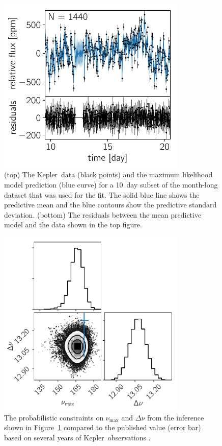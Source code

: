 \documentclass[manuscript, letterpaper]{aastex6}
\newcommand{\project}[1]{\textsf{#1}}
\newcommand{\kepler}{\project{Kepler}}
\newcommand{\figureref}[1]{\ref{fig:#1}}
\newcommand{\Figure}[1]{Figure~\figureref{#1}}
\newcommand{\figurelabel}[1]{\label{fig:#1}}
\newcommand{\response}[1]{{\color{blue}#1}}
\begin{document}
\begin{figure}[!htbp]
\begin{center}
\includegraphics[width=0.8\textwidth]{figures/astero/astero.pdf}
\caption{
\response{
(top) The \kepler\ data (black points) and the maximum likelihood model
    prediction (blue curve) for a 10~day subset of the month-long dataset that
    was used for the fit.
    The solid blue line shows the predictive mean and the blue contours show
    the predictive standard deviation.
(bottom) The residuals between the mean predictive model and the data
    shown in the top figure.
}
    \figurelabel{astero}}
\end{center}
\end{figure}

\begin{figure}[!htbp]
\begin{center}
\includegraphics[width=0.8\textwidth]{figures/astero/astero-corner.pdf}
\caption{The probabilistic constraints on $\nu_\mathrm{max}$ and $\Delta \nu$
    from the inference shown in \Figure{astero} compared to the published
    value (error bar) based on several years of \kepler\ observations
    \citep{Pinsonneault:2014}.
    \figurelabel{astero-corner}}
\end{center}
\end{figure}
\end{document}
